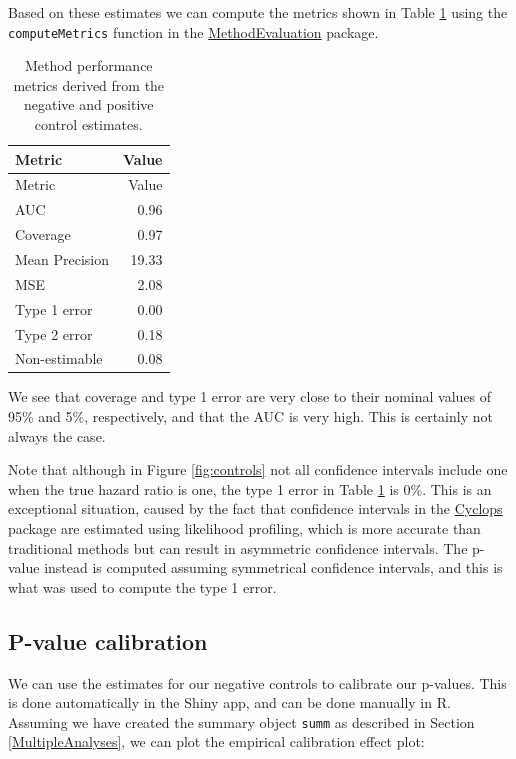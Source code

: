 \documentclass[11pt]{book}
\theoremstyle{definition}
\theoremstyle{definition}
\theoremstyle{definition}
\theoremstyle{remark}
\begin{document}
Based on these estimates we can compute the metrics shown in Table \ref{tab:exampleMetrics} using the \texttt{computeMetrics} function in the \href{https://ohdsi.github.io/MethodEvaluation/}{MethodEvaluation} package.

\begin{longtable}[]{@{}lr@{}}
\caption{\label{tab:exampleMetrics} Method performance metrics derived from the negative and positive control estimates.}\tabularnewline
\toprule
Metric & Value\tabularnewline
\midrule
\endfirsthead
\toprule
Metric & Value\tabularnewline
\midrule
\endhead
AUC & 0.96\tabularnewline
Coverage & 0.97\tabularnewline
Mean Precision & 19.33\tabularnewline
MSE & 2.08\tabularnewline
Type 1 error & 0.00\tabularnewline
Type 2 error & 0.18\tabularnewline
Non-estimable & 0.08\tabularnewline
\bottomrule
\end{longtable}

We see that coverage and type 1 error are very close to their nominal values of 95\% and 5\%, respectively, and that the AUC is very high. This is certainly not always the case.

Note that although in Figure \ref{fig:controls} not all confidence intervals include one when the true hazard ratio is one, the type 1 error in Table \ref{tab:exampleMetrics} is 0\%. This is an exceptional situation, caused by the fact that confidence intervals in the \href{https://ohdsi.github.io/Cyclops/}{Cyclops} package are estimated using likelihood profiling, which is more accurate than traditional methods but can result in asymmetric confidence intervals. The p-value instead is computed assuming symmetrical confidence intervals, and this is what was used to compute the type 1 error.

\hypertarget{p-value-calibration-1}{%
\subsection{P-value calibration}\label{p-value-calibration-1}}

We can use the estimates for our negative controls to calibrate our p-values. This is done automatically in the Shiny app, and can be done manually in R. Assuming we have created the summary object \texttt{summ} as described in Section \ref{MultipleAnalyses}, we can plot the empirical calibration effect plot:
\end{document}
